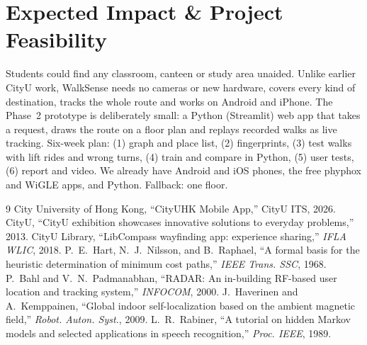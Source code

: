 \documentclass{article}
\begin{document}
\section{Expected Impact \& Project Feasibility}
Students could find any classroom, canteen or study area unaided. Unlike earlier CityU work, WalkSense needs no cameras or new hardware, covers every kind of destination, tracks the whole route and works on Android and iPhone. The Phase~2 prototype is deliberately small: a Python (Streamlit) web app that takes a request, draws the route on a floor plan and replays recorded walks as live tracking. Six-week plan: (1) graph and place list, (2) fingerprints, (3) test walks with lift rides and wrong turns, (4) train and compare in Python, (5) user tests, (6) report and video. We already have Android and iOS phones, the free phyphox and WiGLE apps, and Python. Fallback: one floor.

\setlength{\bibsep}{0pt}
\begin{thebibliography}{9}
\footnotesize
{}
City University of Hong Kong, ``CityUHK Mobile App,'' CityU ITS, 2026.
CityU, ``CityU exhibition showcases innovative solutions to everyday problems,'' 2013.
CityU Library, ``LibCompass wayfinding app: experience sharing,'' \emph{IFLA WLIC}, 2018.
P.~E.~Hart, N.~J.~Nilsson, and B.~Raphael, ``A formal basis for the heuristic determination of minimum cost paths,'' \emph{IEEE Trans. SSC}, 1968.
P.~Bahl and V.~N.~Padmanabhan, ``RADAR: An in-building RF-based user location and tracking system,'' \emph{INFOCOM}, 2000.
J.~Haverinen and A.~Kemppainen, ``Global indoor self-localization based on the ambient magnetic field,'' \emph{Robot. Auton. Syst.}, 2009.
L.~R.~Rabiner, ``A tutorial on hidden Markov models and selected applications in speech recognition,'' \emph{Proc. IEEE}, 1989.
\end{thebibliography}
\end{document}
